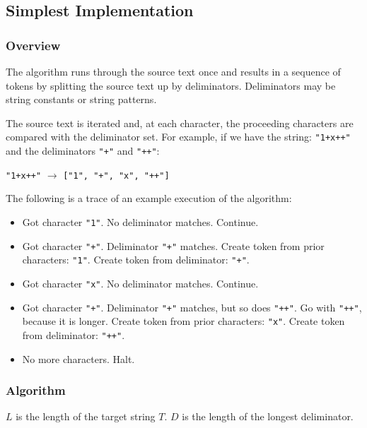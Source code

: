 \documentclass[10pt,a4paper]{article}
\begin{document}
\subsection{Simplest Implementation}
\label{sec:SimplestImplementation}

\subsubsection{Overview}
\label{sec:OverviewOfTheAlgorithm}
The algorithm runs through the source text once and results in a sequence of tokens by splitting the source text up by deliminators. Deliminators may be string constants or string patterns. 

The source text is iterated and, at each character, the proceeding characters are compared with the deliminator set. For example, if we have the string: \verb|"1+x++"| and the deliminators \verb|"+"| and \verb|"++"|: \newline

\verb|"1+x++"| $\rightarrow$ \verb|["1", "+", "x", "++"]| \newline

The following is a trace of an example execution of the algorithm:
\begin{itemize}
\item Got character \verb|"1"|. No deliminator matches. Continue.
\item Got character \verb|"+"|. Deliminator \verb|"+"| matches. Create token from prior characters: \verb|"1"|. Create token from deliminator: \verb|"+"|.
\item Got character \verb|"x"|. No deliminator matches. Continue.
\item Got character \verb|"+"|. Deliminator \verb|"+"| matches, but so does \verb|"++"|. Go with \verb|"++"|, because it is longer. Create token from prior characters: \verb|"x"|. Create token from deliminator: \verb|"++"|.
\item No more characters. Halt.
\end{itemize}

\newpage
\subsubsection{Algorithm}
$L$ is the length of the target string $T$. $D$ is the length of the longest deliminator.
\end{document}
